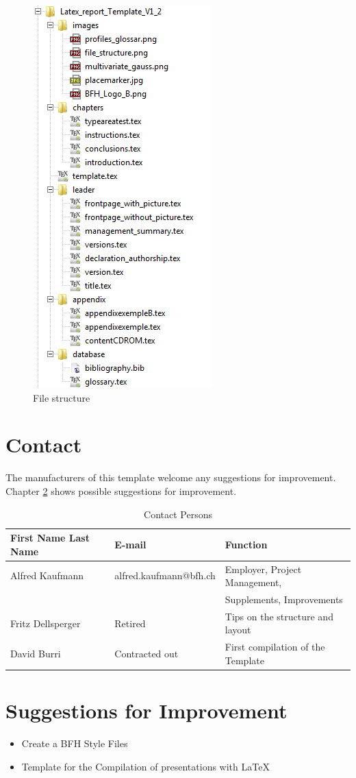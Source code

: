 \begin{figure}[H]
	\centering
		\includegraphics[scale=0.85]{images/file_structure.png}
	\caption{File structure}
	\label{fig:file_structure}
\end{figure}

\section{Contact}
\label{sec:introduction_contact}

The manufacturers of this template welcome any suggestions for improvement. Chapter \ref{sec:introduction_suggestions} shows possible suggestions for improvement.

\begin{table}[H]
	\centering
		\begin{tabular}{lll} \toprule
			\textbf{First Name Last Name} & \textbf{E-mail} & \textbf{Function} \\ \midrule
			Alfred Kaufmann & alfred.kaufmann@bfh.ch & Employer, Project Management, \\
			& & Supplements, Improvements \\ \midrule
			Fritz Dellsperger & Retired & Tips on the structure and layout \\ \midrule
			David Burri & Contracted out & First compilation of the Template \\ \bottomrule
		\end{tabular}
	\caption{Contact Persons}
	\label{tab:Contact Persons}
\end{table}


\section{Suggestions for Improvement}
\label{sec:introduction_suggestions}

\begin{itemize}
	\item Create a BFH Style Files
	\item Template for the Compilation of presentations with \LaTeX{}
\end{itemize}


